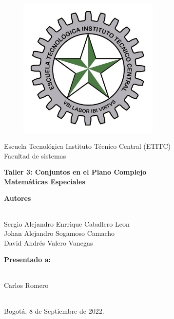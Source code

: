 \documentclass[a4paper,11pt,openany]{book}
\begin{document}
\begin{titlepage}
 
\begin{center}
\vspace*{-1in}
\begin{figure}[htb]
\begin{center}
\includegraphics[width=7cm]{ETITC.png}
\end{center}
\end{figure}
 
 
{\sc \huge Escuela Tecnológica Instituto Técnico Central (ETITC)}\\
\vspace*{0.15in}
Facultad de sistemas\\
\vspace*{0.6in}
\begin{Large}
\textbf{Taller 3: Conjuntos en el Plano Complejo} \\
\textbf{Matem{\'a}ticas Especiales}\\
\end{Large}
\vspace*{0.3in}
\begin{large}
{\bf Autores} \\
 
\ 
 
Sergio Alejandro Enrrique Caballero Leon\\ 
Johan Alejandro Sogamoso Camacho \\
David Andrés Valero Vanegas \\
\end{large}
\vspace*{0.3in}
 
\end{center}
 
\begin{center}
{\bf Presentado a:} \\
 
\ 
 
Carlos Romero \\
 
\
 
Bogot{\'a}, 8 de Septiembre de 2022.
\end{center}
 
\end{titlepage}
\end{document}
